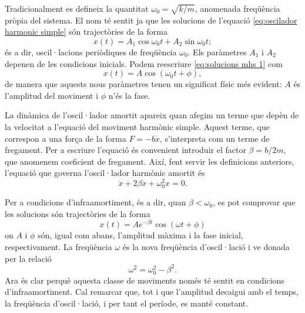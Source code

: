 \documentclass[12pt,a4paper]{article}
\numberwithin{equation}{section}
\begin{document}
Tradicionalment es defineix la quantitat \( \omega_0 = \sqrt{k / m} \), anomenada freqüència pròpia del sistema. El nom té sentit ja que les solucions de l'equació \ref{eq:oscilador harmonic simple} són trajectòries de la forma
\begin{equation}
  x(t) = A_1\cos{\omega_0 t} + A_2\sin{\omega_0 t}; \label{eq:solucions mhs 1}
\end{equation}
és a dir, oscil·lacions periòdiques de freqüència \( \omega_0 \). Els paràmetres \( A_1 \) i \( A_2 \) depenen de les condicions inicials. Podem reescriure \ref{eq:solucions mhs 1} com
\begin{equation}
  x(t) = A\cos({\omega_0 t + \phi}), \label{eq:solucions mhs 2}
\end{equation}
de manera que aquests nous paràmetres tenen un significat físic més evident: \( A \) és l'amplitud del moviment i \( \phi \) n'és la fase.

La dinàmica de l'oscil·lador amortit apareix quan afegim un terme que depèn de la velocitat a l'equació del moviment harmònic simple. Aquest terme, que correspon a una força de la forma \( F = -b\dot{x} \), s'interpreta com un terme de fregament. Per a escriure l'equació és convenient introduir el factor \( \beta = b/2m \), que anomenem coeficient de fregament. Així, fent servir les definicions anteriors, l'equació que governa l'oscil·lador harmònic amortit és
\begin{equation}
  \ddot{x} + 2\beta \dot{x} + \omega_0^2 x = 0. \label{eq:oscilador harmonic amortit}
\end{equation}

Per a condicions d'infraamortiment, és a dir, quan \( \beta < \omega_0 \), es pot comprovar que les solucions són trajectòries de la forma
\begin{equation}
  x(t) = Ae^{-\beta t}\cos({\omega t + \phi}) \label{eq:solucions mha}
\end{equation}
on \( A \) i \( \phi \) són, igual com abans, l'amplitud màxima i la fase inicial, respectivament. La freqüència \( \omega \) és la nova freqüència d'oscil·lació i ve donada per la relació
\begin{equation}
  \omega^2 = \omega_0^2 - \beta^2. \label{eq:nova frequencia}
\end{equation}
Ara és clar perquè aquesta classe de moviments només té sentit en condicions d'infraamortiment. Cal remarcar que, tot i que l'amplitud decaigui amb el temps, la freqüència d'oscil·lació, i per tant el període, es manté constant. 
\end{document}
